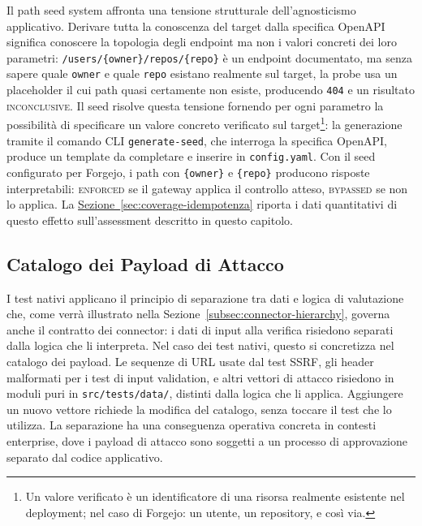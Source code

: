Il path seed system affronta una tensione strutturale dell'agnosticismo applicativo. Derivare tutta la conoscenza del target dalla specifica OpenAPI significa conoscere la topologia degli endpoint ma non i valori concreti dei loro parametri: \texttt{/users/\{owner\}/repos/\{repo\}} è un endpoint documentato, ma senza sapere quale \texttt{owner} e quale \texttt{repo} esistano realmente sul target, la probe usa un placeholder il cui path quasi certamente non esiste, producendo \texttt{404} e un risultato \textsc{inconclusive}. Il seed risolve questa tensione fornendo per ogni parametro la possibilità di specificare un valore concreto verificato sul target\footnote{Un valore verificato è un identificatore di una risorsa realmente esistente nel deployment; nel caso di Forgejo: un utente, un repository, e così via.}: la generazione tramite il comando \gls{CLI} \texttt{generate-seed}, che interroga la specifica OpenAPI, produce un template da completare e inserire in \texttt{config.yaml}. Con il seed configurato per Forgejo, i path con \texttt{\{owner\}} e \texttt{\{repo\}} producono risposte interpretabili: \textsc{enforced} se il gateway applica il controllo atteso, \textsc{bypassed} se non lo applica. La \hyperref[sec:coverage-idempotenza]{Sezione~\ref*{sec:coverage-idempotenza}} riporta i dati quantitativi di questo effetto sull'assessment descritto in questo capitolo.


\subsection{Catalogo dei Payload di Attacco}\label{subsec:payload-catalog}

I test nativi applicano il principio di separazione tra dati e logica di valutazione che, come verrà illustrato nella Sezione~\ref{subsec:connector-hierarchy}, governa anche il contratto dei connector: i dati di input alla verifica risiedono separati dalla logica che li interpreta. Nel caso dei test nativi, questo si concretizza nel catalogo dei payload. Le sequenze di \gls{URL} usate dal test \gls{SSRF}, gli header malformati per i test di input validation, e altri vettori di attacco risiedono in moduli puri in \texttt{src/tests/data/}, distinti dalla logica che li applica. Aggiungere un nuovo vettore richiede la modifica del catalogo, senza toccare il test che lo utilizza. La separazione ha una conseguenza operativa concreta in contesti enterprise, dove i payload di attacco sono soggetti a un processo di approvazione separato dal codice applicativo.

